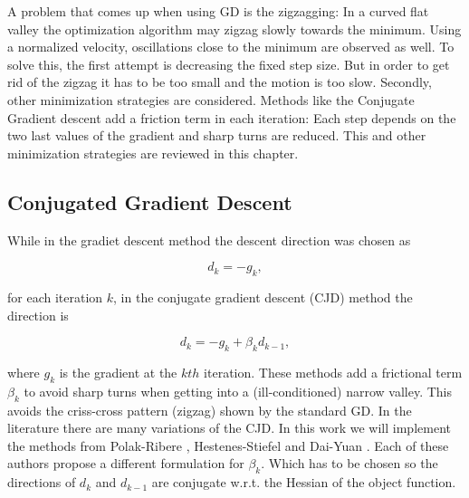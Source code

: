 \label{subsubsec:zigzag}


A problem that comes up when using GD is the zigzagging: In a curved flat valley the optimization algorithm may zigzag slowly towards the minimum. Using a normalized velocity, oscillations close to the minimum are observed as well. 
To solve this, the first attempt is decreasing the fixed step size. But in order to get rid of the zigzag it has to be too small and the motion is too slow.
Secondly, other minimization strategies are considered. Methods like the Conjugate Gradient descent add a friction term in each iteration: Each step depends on the two last values of the gradient and sharp turns are reduced. This and other minimization strategies are reviewed in this chapter.



\subsection{Conjugated Gradient Descent}
\label{subsec:CJD}



While in the gradiet descent method the descent direction was chosen as 

\begin{equation}
d_k = -g_k ,
\end{equation} 

for each iteration $k$, in the conjugate gradient descent (CJD) method the direction is

\begin{equation}
d_k = -g_k + \beta_k d_{k-1},
\end{equation}

where $g_k$ is the gradient at the $kth$ iteration. These methods add a frictional term $\beta_k$ to avoid sharp turns when getting into a (ill-conditioned) narrow valley. This avoids the criss-cross pattern (zigzag) shown by the standard GD.
%
In the literature there are many variations of the CJD. In this work we will implement  the methods from Polak-Ribere \cite{polak},  Hestenes-Stiefel \cite{hestenes} and Dai-Yuan \cite{dai}. Each of these authors propose a different formulation for $\beta_k$. Which has to be chosen so the directions of $d_{k}$ and $d_{k-1}$ are conjugate w.r.t. the Hessian of the object function.


